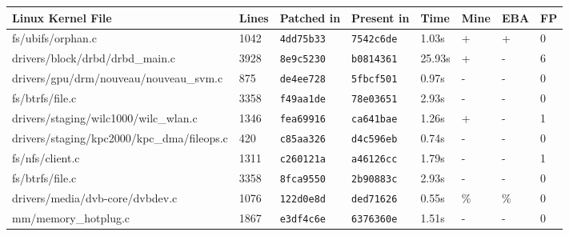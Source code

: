 \begin{table}[H]
    \centering
    \setlength{\tabcolsep}{5pt}
    \renewcommand{\arraystretch}{1.25}
    \scriptsize
    \begin{tabular}{llllllll}
    \textbf{Linux Kernel File}                    & \textbf{Lines} & \textbf{Patched in} & \textbf{Present in} & \textbf{Time} & \textbf{Mine} & \textbf{EBA} & \textbf{FP} \\
    \hline
    fs/ubifs/orphan.c                             & 1042           & \texttt{4dd75b33}   & \texttt{7542c6de}   & 1.03s         & +             & +            & 0           \\
    drivers/block/drbd/drbd\_main.c               & 3928           & \texttt{8e9c5230}   & \texttt{b0814361}   & 25.93s        & +             & -            & 6           \\
    drivers/gpu/drm/nouveau/nouveau\_svm.c        & 875            & \texttt{de4ee728}   & \texttt{5fbcf501}   & 0.97s         & -             & -            & 0           \\
    fs/btrfs/file.c                               & 3358           & \texttt{f49aa1de}   & \texttt{78e03651}   & 2.93s         & -             & -            & 0           \\
    drivers/staging/wilc1000/wilc\_wlan.c         & 1346           & \texttt{fea69916}   & \texttt{ca641bae}   & 1.26s         & +             & -            & 1           \\
    drivers/staging/kpc2000/kpc\_dma/fileops.c    & 420            & \texttt{c85aa326}   & \texttt{d4c596eb}   & 0.74s         & -             & -            & 0           \\
    fs/nfs/client.c                               & 1311           & \texttt{c260121a}   & \texttt{a46126cc}   & 1.79s         & -             & -            & 1           \\
    fs/btrfs/file.c                               & 3358           & \texttt{8fca9550}   & \texttt{2b90883c}   & 2.93s         & -             & -            & 0           \\
    drivers/media/dvb-core/dvbdev.c               & 1076           & \texttt{122d0e8d}   & \texttt{ded71626}   & 0.55s         & \%            & \%           & 0           \\
    mm/memory\_hotplug.c                          & 1867           & \texttt{e3df4c6e}   & \texttt{6376360e}   & 1.51s         & -             & -            & 0           \\

\end{tabular}
\end{table}
